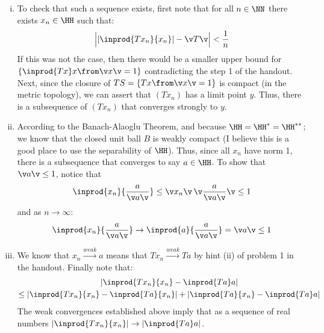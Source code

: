 \begin{enumerate}[(i)]
\item To check that such a sequence exists, first note that for all $n\in \NN$ there exists $x_n\in \HH$ such that:
$$\Big| |\inprod{Tx_n}{x_n}| - \v T\v\Big|<\frac 1n$$
If this was not the case, then there would be a smaller upper bound for $\{ \inprod {Tx}x\from \v x\v=1\}$ contradicting the step 1 of the handout.
Next, since the closure of $TS=\{Tx\from \v x\v =1\}$ is compact (in the metric topology), we can assert that $(Tx_n)$ has a limit point $y$.
Thus, there is a subsequence of $(Tx_n)$ that converges strongly to $y$.
 
\item  According to the Banach-Alaoglu Theorem, and because $\HH=\HH^*=\HH^{**}$; we know  that the closed unit ball $B$ is weakly compact (I believe this is a good place to use the separability of $\HH$).
    Thus, since all $x_n$ have norm 1, there is a subsequence that converges to say $a\in \HH$. 
    To show that $\v a\v\leq 1$, notice that 
    $$\inprod{x_n}{\frac a{\v a\v}}\leq \v x_n\v\, \v \frac a{\v a\v}\v \leq 1$$
    and as $n\to \infty$:
    $$\inprod{x_n}{\frac a{\v a\v}}\to \inprod{a}{\frac a{\v a\v}}=\v a\v\leq 1$$
\item We know that $x_n\xrightarrow{weak} a$ means that $Tx_n\xrightarrow{weak} Ta$ by hint (ii) of problem 1 in the handout.
    Finally note that:
    \begin{gather*}
        |\inprod{Tx_n}{x_n} - \inprod{Ta}a| \\
        \leq |\inprod{Tx_n}{x_n} - \inprod{Ta}{x_n}|+ |\inprod{Ta}{x_n} - \inprod{Ta}a|
    \end{gather*}
    The weak convergences established above imply that as a sequence of real numbers $|\inprod{Tx_n}{x_n}| \to  |\inprod{Ta}a|$.
\end{enumerate}
